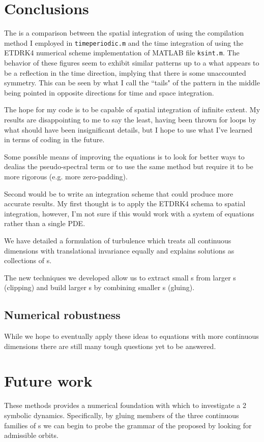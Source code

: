 \section{Conclusions}
The  is a comparison between the spatial integration
of  using the compilation method I employed in
\texttt{timeperiodic.m} and the time integration of 
using the ETDRK4 numerical scheme implementation of MATLAB file
\texttt{ksint.m}. The behavior of these figures seem to exhibit similar
patterns up to a what appears to be a reflection in the time direction,
implying that there is some unaccounted symmetry. This can be seen by
what I call the ``tails" of the pattern in the middle being pointed in
opposite directions for time and space integration.

The hope for my code is to be capable of spatial integration of infinite
 extent. My results are disappointing to me to say the least, having been
  thrown for loops by what should have been insignificant details, but
  I hope to use what I've learned in terms of coding in the future.

Some possible means of improving the equations is to look for better ways to
 dealias the pseudo-spectral term or to use the same method but require it to be more rigorous (e.g. more zero-padding).

Second would be to write an integration scheme that could produce more
accurate results. My first thought is to apply the ETDRK4 schema to spatial
 integration, however, I'm not sure if this would work with a system of
 equations rather than a single PDE.

We have detailed a {\spt} formulation of turbulence
which treats all continuous dimensions with translational
invariance equally and
explains solutions as collections of {\fpo}s.

The new techniques we developed allow us
to extract small {\po}s from larger {\po}s (clipping) and build larger {\po}s
by combining smaller {\po}s (gluing).
\subsection{Numerical robustness}

While we hope to eventually apply these ideas to equations with more continuous
dimensions there are still many tough questions yet to be answered.
\section{Future work}
These methods provides a numerical foundation
with which to investigate a 2{\dmn}{\spt} symbolic dynamics.
Specifically, by gluing members of the three continuous families of {\fpo}s
we can begin to probe the grammar of the proposed {\symbolic} by looking
for admissible orbits.

